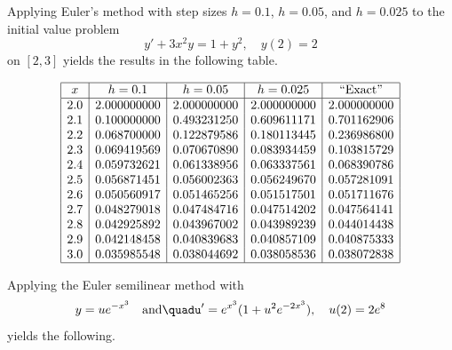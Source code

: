 \documentclass{ximera}
\begin{document}
\begin{example}{\color{blue}}\label{example:3.1.6}
Applying Euler's method with step sizes $h=0.1$, $h=0.05$, and
$h=0.025$ to  the initial value problem
\begin{equation}\label{eq:3.1.26}
y'+3x^2y=1+y^2,\quad y(2)=2
\end{equation}
on  $[2,3]$ yields the results in the following table. 

$$
\begin{array}{|c|c|c|c|c|}
\hline
x&
h=0.1&
h=0.05&
h=0.025&
\text{``Exact''} \\ \hline
2.0 &2.000000000 & 2.000000000 & 2.000000000 & 2.000000000 \\
2.1 &0.100000000 & 0.493231250 & 0.609611171 & 0.701162906 \\
2.2 &0.068700000 & 0.122879586 & 0.180113445 & 0.236986800 \\
2.3 &0.069419569 & 0.070670890 & 0.083934459 & 0.103815729 \\
2.4 &0.059732621 & 0.061338956 & 0.063337561 & 0.068390786 \\
2.5 &0.056871451 & 0.056002363 & 0.056249670 & 0.057281091 \\
2.6 &0.050560917 & 0.051465256 & 0.051517501 & 0.051711676 \\
2.7 &0.048279018 & 0.047484716 & 0.047514202 & 0.047564141 \\
2.8 &0.042925892 & 0.043967002 & 0.043989239 & 0.044014438 \\
2.9 &0.042148458 & 0.040839683 & 0.040857109 & 0.040875333 \\
3.0 &0.035985548 & 0.038044692 & 0.038058536 & 0.038072838 \\
\hline
\end{array}
$$


Applying the Euler semilinear method with
$$
y=ue^{-x^3}\quad\mbox{and}\quadu'=e^{x^3}(1+u^2e^{-2x^3}),\quad
u(2)=2e^8
$$
yields the following. 


\end{example}
\end{document}
